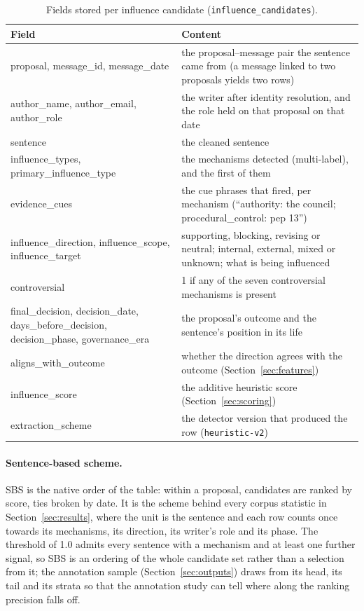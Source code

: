 \begin{table}[t]
\caption{Fields stored per influence candidate (\texttt{influence\_candidates}).}
\label{tab:fields}
\footnotesize
\begin{tabular}{p{}p{}}
\toprule
Field & Content \\
\midrule
proposal, message\_id, message\_date & the proposal--message pair the sentence came from (a message linked to two proposals yields two rows) \\
author\_name, author\_email, author\_role & the writer after identity resolution, and the role held on that proposal on that date \\
sentence & the cleaned sentence \\
influence\_types, primary\_influence\_type & the mechanisms detected (multi-label), and the first of them \\
evidence\_cues & the cue phrases that fired, per mechanism (``authority: the council; procedural\_control: pep 13'') \\
influence\_direction, influence\_scope, influence\_target & supporting, blocking, revising or neutral; internal, external, mixed or unknown; what is being influenced \\
controversial & 1 if any of the seven controversial mechanisms is present \\
final\_decision, decision\_date, days\_before\_decision, decision\_phase, governance\_era & the proposal's outcome and the sentence's position in its life \\
aligns\_with\_outcome & whether the direction agrees with the outcome (Section~\ref{sec:features}) \\
influence\_score & the additive heuristic score (Section~\ref{sec:scoring}) \\
extraction\_scheme & the detector version that produced the row (\texttt{heuristic-v2}) \\
\bottomrule
\end{tabular}
\end{table}

\paragraph{Sentence-based scheme.} SBS is the native order of the table: within a proposal, candidates are ranked by score, ties broken by date. It is the scheme behind every corpus statistic in Section~\ref{sec:results}, where the unit is the sentence and each row counts once towards its mechanisms, its direction, its writer's role and its phase. The threshold of 1.0 admits every sentence with a mechanism and at least one further signal, so SBS is an ordering of the whole candidate set rather than a selection from it; the annotation sample (Section~\ref{sec:outputs}) draws from its head, its tail and its strata so that the annotation study can tell where along the ranking precision falls off.

